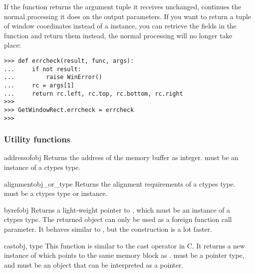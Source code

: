 If the  function returns the argument tuple it receives
unchanged,  continues the normal processing it does on the
output parameters.  If you want to return a tuple of window
coordinates instead of a  instance, you can retrieve the
fields in the function and return them instead, the normal processing
will no longer take place:
\begin{verbatim}
>>> def errcheck(result, func, args):
...     if not result:
...         raise WinError()
...     rc = args[1]
...     return rc.left, rc.top, rc.bottom, rc.right
>>>
>>> GetWindowRect.errcheck = errcheck
>>>
\end{verbatim}


\subsubsection{Utility functions\label{ctypes-utility-functions}}

\begin{funcdesc}{addressof}{obj}
Returns the address of the memory buffer as integer.   must
be an instance of a ctypes type.
\end{funcdesc}

\begin{funcdesc}{alignment}{obj_or_type}
Returns the alignment requirements of a ctypes type.
 must be a ctypes type or instance.
\end{funcdesc}

\begin{funcdesc}{byref}{obj}
Returns a light-weight pointer to , which must be an
instance of a ctypes type. The returned object can only be used as
a foreign function call parameter. It behaves similar to
, but the construction is a lot faster.
\end{funcdesc}

\begin{funcdesc}{cast}{obj, type}
This function is similar to the cast operator in C. It returns a
new instance of  which points to the same memory block as
.  must be a pointer type, and  must be an
object that can be interpreted as a pointer.
\end{funcdesc}

